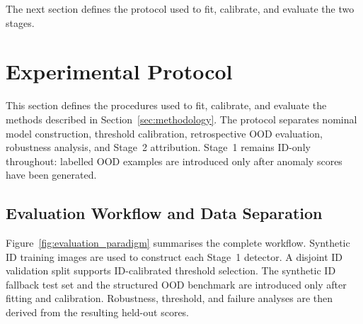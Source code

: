\documentclass[fleqn,12pt]{olplainarticle}
\begin{document}
The next section defines the protocol used to fit, calibrate, and evaluate the
two stages.

\newpage
\section{Experimental Protocol}
\label{sec:experimental_protocol}

This section defines the procedures used to fit, calibrate, and evaluate the
methods described in Section~\ref{sec:methodology}. The protocol separates
nominal model construction, threshold calibration, retrospective OOD
evaluation, robustness analysis, and Stage~2 attribution. Stage~1 remains
ID-only throughout: labelled OOD examples are introduced only after anomaly
scores have been generated.

\subsection{Evaluation Workflow and Data Separation}
\label{subsec:evaluation_workflow}

Figure~\ref{fig:evaluation_paradigm} summarises the complete workflow.
Synthetic ID training images are used to construct each Stage~1 detector. A
disjoint ID validation split supports ID-calibrated threshold selection. The
synthetic ID fallback test set and the structured OOD benchmark are introduced
only after fitting and calibration. Robustness, threshold, and failure
analyses are then derived from the resulting held-out scores.
\end{document}

